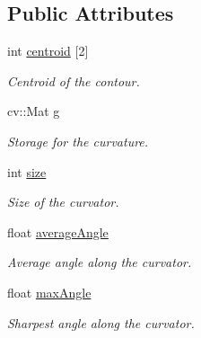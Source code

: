 \subsection*{Public Attributes}
\begin{DoxyCompactItemize}
\item 
\hypertarget{structcurve_a434421bfdc9c8961a28590ef99f83e00}{}\label{structcurve_a434421bfdc9c8961a28590ef99f83e00} 
int \hyperlink{structcurve_a434421bfdc9c8961a28590ef99f83e00}{centroid} \mbox{[}2\mbox{]}
\begin{DoxyCompactList}\small\item\em Centroid of the contour. \end{DoxyCompactList}\item 
\hypertarget{structcurve_afb7fe75fc30f7a832dbb845db62a5244}{}\label{structcurve_afb7fe75fc30f7a832dbb845db62a5244} 
cv\+::\+Mat \hyperlink{structcurve_afb7fe75fc30f7a832dbb845db62a5244}{g}
\begin{DoxyCompactList}\small\item\em Storage for the curvature. \end{DoxyCompactList}\item 
\hypertarget{structcurve_a6a90092a2b62540ae3993cdb469f8451}{}\label{structcurve_a6a90092a2b62540ae3993cdb469f8451} 
int \hyperlink{structcurve_a6a90092a2b62540ae3993cdb469f8451}{size}
\begin{DoxyCompactList}\small\item\em Size of the curvator. \end{DoxyCompactList}\item 
\hypertarget{structcurve_a67806447783717dcb334f0e6c8dd0093}{}\label{structcurve_a67806447783717dcb334f0e6c8dd0093} 
float \hyperlink{structcurve_a67806447783717dcb334f0e6c8dd0093}{average\+Angle}
\begin{DoxyCompactList}\small\item\em Average angle along the curvator. \end{DoxyCompactList}\item 
\hypertarget{structcurve_ae5ccde75e194081b8c4b0c00f7af4879}{}\label{structcurve_ae5ccde75e194081b8c4b0c00f7af4879} 
float \hyperlink{structcurve_ae5ccde75e194081b8c4b0c00f7af4879}{max\+Angle}
\begin{DoxyCompactList}\small\item\em Sharpest angle along the curvator. \end{DoxyCompactList}\end{DoxyCompactItemize}


